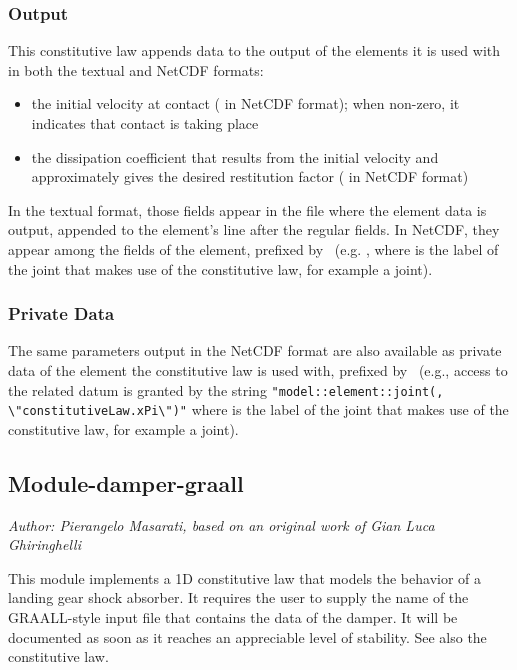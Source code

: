 \subsubsection{Output}
This constitutive law appends data to the output of the elements it is used with in both the textual and NetCDF formats:
\begin{itemize}
\item the initial velocity at contact ( in NetCDF format); when non-zero, it indicates that contact is taking place
\item the dissipation coefficient that results from the initial velocity and approximately gives the desired restitution factor ( in NetCDF format)
\end{itemize}
In the textual format, those fields appear in the file where the element data is output, appended to the element's line after the regular fields.
In NetCDF, they appear among the fields of the element, prefixed by \ (e.g. , where  is the label of the joint that makes use of the constitutive law, for example a  joint).

\subsubsection{Private Data}
The same parameters output in the NetCDF format are also available as private data of the element the constitutive law is used with, prefixed by \ (e.g., access to the related datum is granted by the string \texttt{"model::element::joint(, \textbackslash"constitutiveLaw.xPi\textbackslash")"} where  is the label of the joint that makes use of the constitutive law, for example a  joint).



\subsection{Module-damper-graall}
\emph{Author: Pierangelo Masarati, based on an original work of Gian Luca Ghiringhelli}

This module implements a 1D constitutive law that models
the behavior of a landing gear shock absorber.
It requires the user to supply the name of the GRAALL-style 
input file that contains the data of the damper.
It will be documented as soon as it reaches an appreciable level
of stability.
See also the 
constitutive law.

